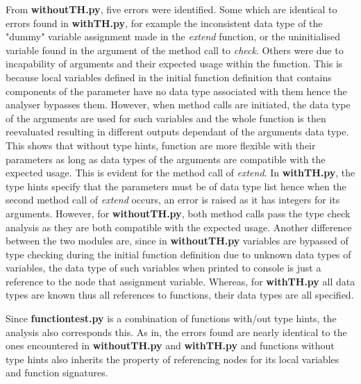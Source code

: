 \documentclass{l4proj}
\begin{document}
From \textbf{withoutTH.py}, five errors were identified. Some which are identical to errors found in \textbf{withTH.py}, for example the inconsistent data type of the "dummy" variable assignment made in the \textit{extend} function, or the uninitialised variable found in the argument of the method call to \textit{check}. Others were due to incapability of arguments and their expected usage within the function. This is because local variables defined in the initial function definition that contains components of the parameter have no data type associated with them hence the analyser bypasses them. However, when method calls are initiated, the data type of the arguments are used for such variables and the whole function is then reevaluated resulting in different outputs dependant of the arguments data type. This shows that without type hints, function are more flexible with their parameters as long as data types of the arguments are compatible with the expected usage. This is evident for the method call of \textit{extend}. In \textbf{withTH.py}, the type hints specify that the parameters must be of data type list hence when the second method call of \textit{extend} occurs, an error is raised as it has integers for its arguments. However, for \textbf{withoutTH.py}, both method calls pass the type check analysis as they are both compatible with the expected usage. Another difference between the two modules are, since in \textbf{withoutTH.py} variables are bypassed of type checking during the initial function definition due to unknown data types of variables, the data type of such variables when printed to console is just a reference to the node that assignment variable. Whereas, for \textbf{withTH.py} all data types are known thus all references to functions, their data types are all specified. 

Since \textbf{function\textunderscore test.py} is a combination of functions with/out type hints, the analysis also corresponds this. As in, the errors found are nearly identical to the ones encountered in \textbf{withoutTH.py} and \textbf{withTH.py} and functions without type hints also inherits the property of referencing nodes for its local variables and function signatures.
\end{document}
